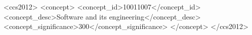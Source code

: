 \documentclass[sigconf]{acmart}
\begin{document}
\begin{CCSXML}
<ccs2012>
   <concept>
       <concept_id>10011007</concept_id>
       <concept_desc>Software and its engineering</concept_desc>
       <concept_significance>300</concept_significance>
       </concept>
 </ccs2012>
\end{CCSXML}




\pagestyle{plain}

\maketitle












\balance

\end{document}
